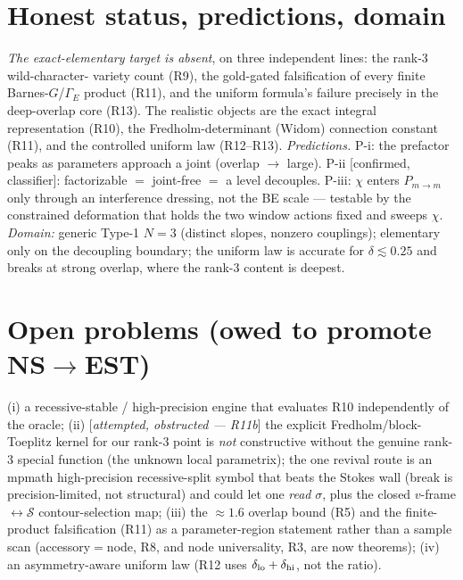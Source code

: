 \documentclass[aps,prd,reprint,nofootinbib]{revtex4-2}
\newcommand{\Scat}{\mathcal{S}}   %
\newcommand{\Pmid}{P_{m\to m}}   %
\newcommand{\GE}{\Gamma_{\!E}} %
\begin{document}
\section{Honest status, predictions, domain}
\emph{The exact-elementary target is absent}, on three independent lines: the rank-3 wild-character-
variety count (R9), the gold-gated falsification of every finite Barnes-$G$/$\GE$ product (R11), and
the uniform formula's failure precisely in the deep-overlap core (R13). The realistic objects are the
exact integral representation (R10), the Fredholm-determinant (Widom) connection constant (R11), and the controlled
uniform law (R12--R13). \emph{Predictions.} P-i: the prefactor peaks as parameters approach a joint
(overlap $\to$ large). P-ii [confirmed, classifier]: factorizable $=$ joint-free $=$ a level
decouples. P-iii: $\chi$ enters $\Pmid$ only through an interference dressing, not the BE scale ---
testable by the constrained deformation that holds the two window actions fixed and sweeps $\chi$.
\emph{Domain:} generic Type-1 $N{=}3$ (distinct slopes, nonzero couplings); elementary only on the
decoupling boundary; the uniform law is accurate for $\delta\lesssim0.25$ and breaks at strong
overlap, where the rank-3 content is deepest.

\section{Open problems (owed to promote NS$\to$EST)}
(i) a recessive-stable / high-precision engine that evaluates R10 independently of the oracle;
(ii) [\emph{attempted, obstructed --- R11b}] the explicit Fredholm/block-Toeplitz kernel for our
rank-3 point is \emph{not} constructive without the genuine rank-3 special function (the unknown
local parametrix); the one revival route is an mpmath high-precision recessive-split symbol that
beats the Stokes wall (break is precision-limited, not structural) and could let one \emph{read}
$\sigma$, plus the closed $v$-frame$\leftrightarrow\Scat$ contour-selection map; (iii) the
$\approx1.6$ overlap bound (R5) and the finite-product falsification (R11) as a
parameter-region statement rather than a sample scan (accessory$=$node, R8, and node universality,
R3, are now theorems);
(iv) an asymmetry-aware uniform law (R12 uses $\delta_{\rm lo}+\delta_{\rm hi}$, not the ratio).
\end{document}
